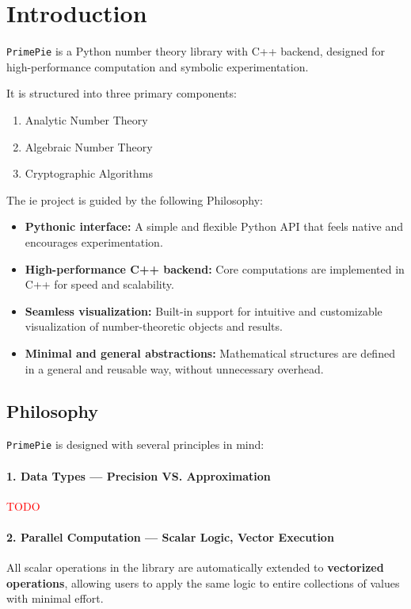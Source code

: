 \section{Introduction}

\texttt{PrimePie} is a Python number theory library with C++ backend, designed for high-performance computation and symbolic experimentation.

It is structured into three primary components:
\begin{enumerate}
    \item Analytic Number Theory
    \item Algebraic Number Theory
    \item Cryptographic Algorithms
\end{enumerate}
The ie project is guided by the following Philosophy:
\begin{itemize}
    \item \textbf{Pythonic interface:} A simple and flexible Python API that feels native and encourages experimentation.
    \item \textbf{High-performance C++ backend:} Core computations are implemented in C++ for speed and scalability.
    \item \textbf{Seamless visualization:} Built-in support for intuitive and customizable visualization of number-theoretic objects and results.
    \item \textbf{Minimal and general abstractions:} Mathematical structures are defined in a general and reusable way, without unnecessary overhead.
\end{itemize}


\subsection{Philosophy}

\texttt{PrimePie} is designed with several principles in mind:

\paragraph{1. Data Types — Precision VS. Approximation}  
\textcolor{red}{TODO}


\paragraph{2. Parallel Computation — Scalar Logic, Vector Execution}  
All scalar operations in the library are automatically extended to \textbf{vectorized operations}, allowing users to apply the same logic to entire collections of values with minimal effort.

